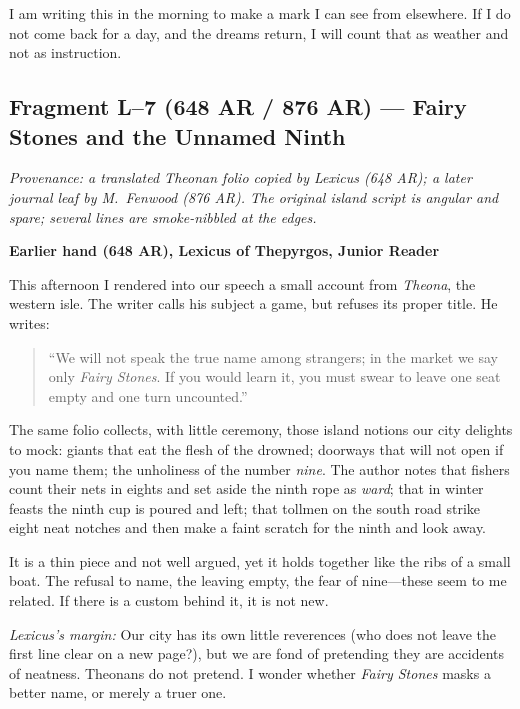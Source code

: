 \documentclass[11pt]{article}
\begin{document}
I am writing this in the morning to make a mark I can see from elsewhere. If I do not come back for a day, and the dreams return, I will count that as weather and not as instruction.

\subsection{Fragment L--7 (648 AR / 876 AR) --- Fairy Stones and the Unnamed Ninth}
\label{frag:l7}
{}

\noindent\textit{Provenance: a translated Theonan folio copied by Lexicus (648 AR); a later journal leaf by M.\ Fenwood (876 AR). The original island script is angular and spare; several lines are smoke-nibbled at the edges.}

\medskip
\noindent\textbf{Earlier hand (648 AR), Lexicus of Thepyrgos, Junior Reader}

This afternoon I rendered into our speech a small account from \textit{Theona}, the western isle. The writer calls his subject a game, but refuses its proper title. He writes:

\begin{quote}\small
``We will not speak the true name among strangers; in the market we say only \emph{Fairy Stones}. If you would learn it, you must swear to leave one seat empty and one turn uncounted.'' 
\end{quote}

The same folio collects, with little ceremony, those island notions our city delights to mock: giants that eat the flesh of the drowned; doorways that will not open if you name them; the unholiness of the number \textit{nine}. The author notes that fishers count their nets in eights and set aside the ninth rope as \emph{ward}; that in winter feasts the ninth cup is poured and left; that tollmen on the south road strike eight neat notches and then make a faint scratch for the ninth and look away.

It is a thin piece and not well argued, yet it holds together like the ribs of a small boat. The refusal to name, the leaving empty, the fear of nine---these seem to me related. If there is a custom behind it, it is not new.

\medskip
\noindent\textit{Lexicus’s margin:} Our city has its own little reverences (who does not leave the first line clear on a new page?), but we are fond of pretending they are accidents of neatness. Theonans do not pretend. I wonder whether \emph{Fairy Stones} masks a better name, or merely a truer one.
\end{document}
